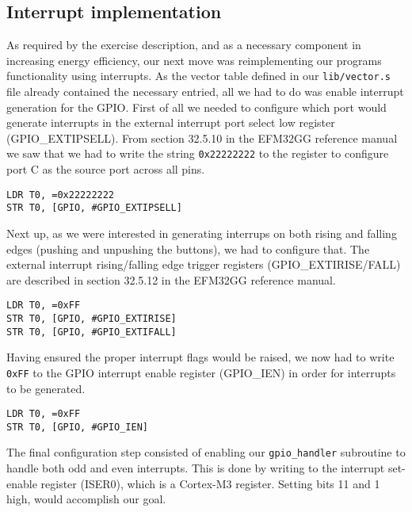 \subsection{Interrupt implementation}
\label{sec:interrupt-implementation}

As required by the exercise description, and as a necessary component in increasing energy efficiency, our next move was reimplementing our programs functionality using interrupts. As the vector table defined in our \texttt{lib/vector.s} file already contained the necessary entried, all we had to do was enable interrupt generation for the GPIO. First of all we needed to configure which port would generate interrupts in the external interrupt port select low register (GPIO\_EXTIPSELL). From section 32.5.10 in the EFM32GG reference manual \cite{efm32ggref} we saw that we had to write the string \texttt{0x22222222} to the register to configure port C as the source port across all pins.

\begin{lstlisting}[label=interrupt-port-select, caption=Configuring GPIO\_EXTIPSELL]
LDR T0, =0x22222222
STR T0, [GPIO, #GPIO_EXTIPSELL]
\end{lstlisting}

Next up, as we were interested in generating interrups on both rising and falling edges (pushing and unpushing the buttons), we had to configure that. The external interrupt rising/falling edge trigger registers (GPIO\_EXTIRISE/FALL) are described in section 32.5.12 in the EFM32GG reference manual. \cite{efm32ggref}

\begin{lstlisting}[label=gpio-edge-config, caption=Rising/falling edge]
LDR T0, =0xFF
STR T0, [GPIO, #GPIO_EXTIRISE]
STR T0, [GPIO, #GPIO_EXTIFALL]
\end{lstlisting}

Having ensured the proper interrupt flags would be raised, we now had to write \texttt{0xFF} to the GPIO interrupt enable register (GPIO\_IEN) in order for interrupts to be generated.

\begin{lstlisting}[label=gpio-ien-config, caption=Enable interrupts in GPIO\_IEN]
LDR T0, =0xFF
STR T0, [GPIO, #GPIO_IEN]
\end{lstlisting}

The final configuration step consisted of enabling our \texttt{gpio\_handler} subroutine to handle both odd and even interrupts. This is done by writing to the interrupt set-enable register (ISER0), which is a Cortex-M3 register. Setting bits 11 and 1 high, would accomplish our goal.

